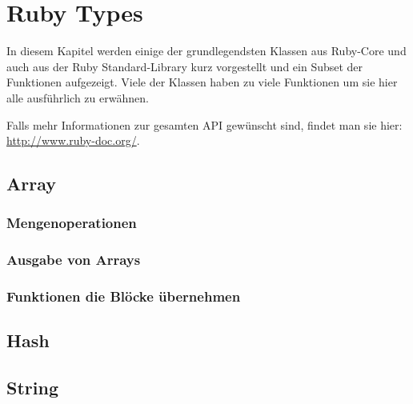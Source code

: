\documentclass[a4book,11pt,twoside]{scrbook}
\begin{document}





\chapter{Ruby Types} %
\label{cha:ruby_types}
In diesem Kapitel werden einige der grundlegendsten Klassen aus Ruby-Core und auch aus der Ruby Standard-Library kurz vorgestellt und ein Subset der Funktionen aufgezeigt. Viele der Klassen haben zu viele Funktionen um sie hier alle ausführlich zu erwähnen.

Falls mehr Informationen zur gesamten API gewünscht sind, findet man sie hier: \url{http://www.ruby-doc.org/}.



\section{Array} %
\label{sec:array}
\subsection{Mengenoperationen} %
\label{sub:mengenoperationen}


\subsection{Ausgabe von Arrays} %
\label{ssub:ausgabe_von_arrays}


\subsection{Funktionen die Blöcke übernehmen} %
\label{sub:funktionen_die_blöcke_übernehmen}




\section{Hash} %
\label{sec:hash}




\section{String} %
\label{sec:string}
\end{document}
